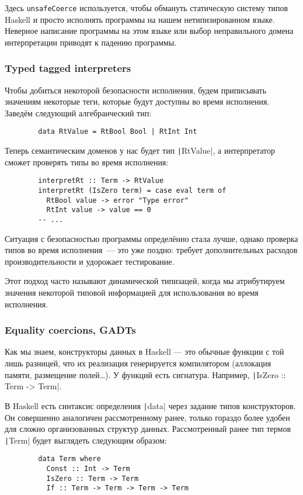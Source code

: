 \documentclass[12pt]{article}
\begin{document}
    Здесь \texttt{unsafeCoerce} используется, чтобы обмануть статическую систему типов Haskell и просто исполнять программы на нашем нетипизированном языке.
    Неверное написание программы на этом языке или выбор неправильного домена интерпретации приводят к падению программы.

    \subsubsection{Typed tagged interpreters}

    Чтобы добиться некоторой безопасности исполнения, будем приписывать значениям некоторые теги, которые будут доступны во время исполнения.
    Заведём следующий алгебраический тип:
    \begin{verbatim}
        data RtValue = RtBool Bool | RtInt Int
    \end{verbatim}

    Теперь семантическим доменов у нас будет тип \texttt|RtValue|, а интерпретатор сможет проверять типы во время исполнения:
    \begin{verbatim}
        interpretRt :: Term -> RtValue
        interpretRt (IsZero term) = case eval term of
          RtBool value -> error "Type error"
          RtInt value -> value == 0
        -- ...
    \end{verbatim}

    Ситуация с безопасностью программы определённо стала лучше, однако проверка типов во время исполнения~--- это уже поздно: требует дополнительных расходов производительности и удорожает тестирование.

    Этот подход часто называют динамической типизацей, когда мы атрибутируем значения некоторой типовой информацией для использования во время исполнения.

    \subsubsection{Equality coercions, GADTs}

    Как мы знаем, конструкторы данных в Haskell --- это обычные функции с той лишь разницей, что их реализация генерируется компилятором (аллокация памяти, размещение полей\ldots).
    У функций есть сигнатура.
    Например, \texttt|IsZero :: Term -> Term|.

    В Haskell есть синтаксис определения \texttt|data| через задание типов конструкторов.
    Он совершенно аналогичен рассмотренному ранее, только гораздо более удобен для сложно организованных структур данных.
    Рассмотренный ранее тип термов \texttt|Term| будет выглядеть следующим образом:
    \begin{verbatim}
        data Term where
          Const :: Int -> Term
          IsZero :: Term -> Term
          If :: Term -> Term -> Term -> Term
    \end{verbatim}
\end{document}
